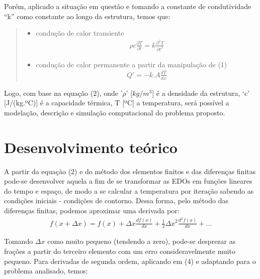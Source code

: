 \documentclass[journal]{IEEEtran}
\begin{document}
        \par Porém, aplicado a situação em questão e tomando a constante de condutividade “k”  como constante ao longo da estrutura, temos que:
        \begin{quote}
                \begin{itemize}
                    \item condução de calor transiente
                    \begin{align}
                        \rho c\frac{\partial T}{\partial t} = k \frac{\partial ^2T}{\partial t^2}
                    \end{align}\cite[pp. 292]{cengel}
                    \item condução de calor permanente a partir da manipulação de (1)
                    \begin{align}
                        Q' = -k.A\frac{dT}{dx}
                    \end{align}
                    \label{list:proprieties}
                \end{itemize}
            \end{quote}
        
        \par Logo, com base na equação (2), onde '$\rho$’ [$kg/m^3$] é a densidade da estrutura, ‘c’ [J/(kg.ºC)] é a capacidade térmica, T [ºC] a temperatura, será possível a modelação, descrição e simulação computacional do problema proposto.
    \section{Desenvolvimento teórico}
        \par A partir da equação (2) e do método dos elementos finitos e das diferenças finitas pode-se desenvolver aquela a fim de se transformar as EDOs em funções lineares do tempo e espaço, de modo a se calcular a temperatura por iteração sabendo as condições iniciais - condições de contorno. Dessa forma, pelo método das diferenças finitas, podemos aproximar uma derivada por:
        \begin{align}
            f(x+\Delta x) = f(x) + \Delta x \frac{df(x)}{dx} + \frac{1}{2}\Delta x^2\frac{d^2f(x)}{dx} + ...
        \end{align}
        
        \par Tomando $\Delta x$ como muito pequeno (tendendo a zero), pode-se desprezar as frações a partir do terceiro elemento com um erro consideravelmente muito pequeno. Para derivadas de segunda ordem,  aplicando em (4) e adaptando para o problema analisado, temos:
        
\end{document}
